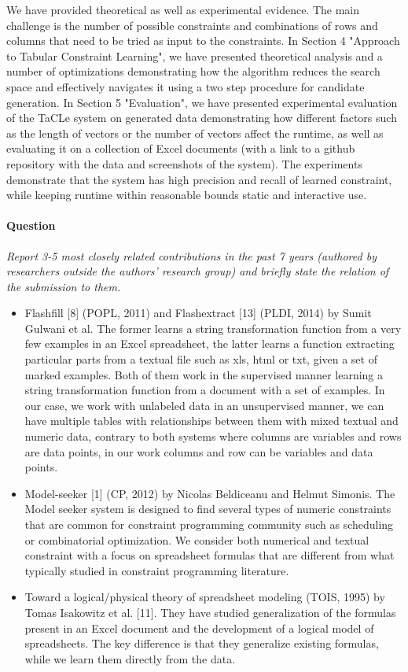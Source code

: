 \documentclass{article}
\begin{document}
We have provided theoretical as well as experimental evidence. The main challenge is the number of possible constraints and combinations of rows and columns that need to be tried as input to the constraints. In Section 4 "Approach to Tabular Constraint Learning", we have presented theoretical analysis and a number of optimizations demonstrating how the algorithm reduces the search space and effectively navigates it using a two step procedure for candidate generation. In Section 5 "Evaluation", we have presented experimental evaluation of the TaCLe system on generated data demonstrating how different factors such as the length of vectors or the number of vectors affect the runtime, as well as evaluating it on a collection of Excel documents (with a link to a github repository with the data and screenshots of the system). The experiments demonstrate that the system has high precision and recall of learned constraint, while keeping runtime within reasonable bounds static and interactive use.


\paragraph{Question} \textit{Report 3-5 most closely related contributions in the past 7 years (authored by researchers outside the authors’ research group) and briefly state the relation of the submission to them.}

\begin{itemize}
  \item Flashfill [8] (POPL, 2011) and Flashextract [13] (PLDI, 2014) by Sumit Gulwani et al. The former learns a string transformation function from a very few examples in an Excel spreadsheet, the latter learns a function extracting particular parts from a textual file such as xls, html or txt, given a set of marked examples. Both of them work in the supervised manner learning a string transformation function from a document with a set of examples. In our case, we work with unlabeled data in an unsupervised manner, we can have multiple tables with relationships between them with mixed textual and numeric data, contrary to both systems where columns are variables and rows are data points, in our work columns and row can be variables and data points.
  \item Model-seeker [1]  (CP, 2012) by Nicolas Beldiceanu and Helmut Simonis. The Model seeker system is designed to find several types of numeric constraints that are common for constraint programming community such as scheduling or combinatorial optimization. We consider both numerical and textual constraint with a focus on spreadsheet formulas that are different from what typically studied in constraint programming literature.
  \item Toward a logical/physical theory of spreadsheet modeling (TOIS, 1995) by Tomas Isakowitz et al. [11]. They have studied generalization of the formulas present in an Excel document and the development of a logical model of spreadsheets. The key difference is that they generalize existing formulas, while we learn them directly from the data.
\end{itemize}
\end{document}
